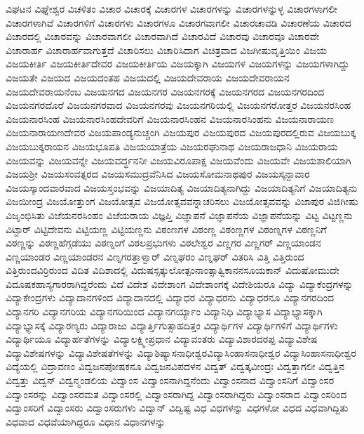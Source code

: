 {ವಿಘಟನ
ವಿಘ್ನೇಶ್ವರ
ವಿಚಳಿತಂ
ವಿಚಾರ
ವಿಚಾರಕ್ಕೆ
ವಿಚಾರಗಳ
ವಿಚಾರಗಳನ್ನು
ವಿಚಾರಗಳನ್ನುಳ್ಳ
ವಿಚಾರಗಳಾಗಲೀ
ವಿಚಾರಗಳಾಗಿವೆ
ವಿಚಾರಗಳಿಗೆ
ವಿಚಾರಗಳು
ವಿಚಾರಗಳೂ
ವಿಚಾರಗವಾಗಲೀ
ವಿಚಾರಚಾವಡಿ
ವಿಚಾರಣೆಯ
ವಿಚಾರದ
ವಿಚಾರದಲ್ಲಿ
ವಿಚಾರವನ್ನು
ವಿಚಾರವಾಗಲೀ
ವಿಚಾರವಾಗಿದೆ
ವಿಚಾರವಿದೆ
ವಿಚಾರವು
ವಿಚಾರವೂ
ವಿಚಾರವೇ
ವಿಚಾರಾರ್ಹ
ವಿಚಾರಾರ್ಹವಾಗುತ್ತದೆ
ವಿಚಾರಿಸಲು
ವಿಚಾರಿಸಿದಾಗ
ವಿಚಿತ್ರವಾದ
ವಿಜಗೀಷುವೃತ್ತಿಯಿಂ
ವಿಜಯ
ವಿಜಯಕೀರ್ತಿ
ವಿಜಯಕೀರ್ತಿದೇವರ
ವಿಜಯಕೀರ್ತಿಯ
ವಿಜಯಕ್ಕಾಗಿ
ವಿಜಯಗಳ
ವಿಜಯಗಳನ್ನು
ವಿಜಯಗಳಾಗಿದ್ದು
ವಿಜಯತೇ
ವಿಜಯದ
ವಿಜಯದಂತಹ
ವಿಜಯದಲ್ಲಿ
ವಿಜಯದೇವರಾಯ
ವಿಜಯದೇವರಾಯನ
ವಿಜಯದೇವರಾಯನೆಂಬ
ವಿಜಯನಗದ
ವಿಜಯನಗರ
ವಿಜಯನಗರಕ್ಕೆ
ವಿಜಯನಗರದ
ವಿಜಯನಗರದಿಂದ
ವಿಜಯನಗರದೊರೆ
ವಿಜಯನಗರವಾದ
ವಿಜಯನಗರವು
ವಿಜಯನಗರಿಯಲ್ಲಿ
ವಿಜಯನಗರೋತ್ತರ
ವಿಜಯನರಸಿಂಹ
ವಿಜಯನಾರಸಿಂಹ
ವಿಜಯನಾರಸಿಂಹದೇವರಿಗೆ
ವಿಜಯನಾರಸಿಂಹನ
ವಿಜಯನಾರಸಿಂಹನು
ವಿಜಯನಾರಾಯಣ
ವಿಜಯನಾರಾಯಣದೇವರ
ವಿಜಯಪಾಂಡ್ಯನುಚ್ಚಂಗಿ
ವಿಜಯಪುರ
ವಿಜಯಪುರದ
ವಿಜಯಪುರದಲ್ಲಿರುವ
ವಿಜಯಬುಕ್ಕ
ವಿಜಯಬುಕ್ಕರಾಯನ
ವಿಜಯಭೂಪತಿ
ವಿಜಯಯಾತ್ರೆಯ
ವಿಜಯರಘುನಾಥ
ವಿಜಯರಾಜಧಾನಿ
ವಿಜಯರಾಯ
ವಿಜಯವನ್ನು
ವಿಜಯವನ್ನೇ
ವಿಜಯವರ್ದ್ಧನನೀ
ವಿಜಯವಿರೂಪಾಕ್ಷ
ವಿಜಯವೆಂದು
ವಿಜಯವೇ
ವಿಜಯಶಾಲಿಯಾಗಿ
ವಿಜಯಶ್ರೀ
ವಿಜಯಸಂವತ್ಸರದ
ವಿಜಯಸಮುದ್ರವೆನಿಸಿದ
ವಿಜಯಸೋಮನಾಥಪುರ
ವಿಜಯಸ್ಕನ್ದಾವಾರ
ವಿಜಯಸ್ಕಾಂದವಾರವಾದ
ವಿಜಯಸ್ತಂಭವನ್ನು
ವಿಜಯಾದಿತ್ಯ
ವಿಜಯಾದಿತ್ಯನಾಗಿದ್ದು
ವಿಜಯಾದಿತ್ಯನಿಗೆ
ವಿಜಯಾದಿತ್ಯನು
ವಿಜಯೀಂದ್ರ
ವಿಜಯೋತ್ತುಂಗ
ವಿಜಯೋತ್ಸವ
ವಿಜಯೋತ್ಸವವನ್ನಾಚರಿಸಲು
ವಿಜಯೋತ್ಸವವನ್ನು
ವಿಜಾಪುರ
ವಿಜಿಗೀಷು
ವಿಜೃಂಭಿಸಿತು
ವಿಜೆಯನರಸಿಂಹಂ
ವಿಜೆಯರಾಯ
ವಿಜ್ಞಪ್ತಿ
ವಿಜ್ಞಾಪನೆ
ವಿಜ್ಞಾಪನೆಯ
ವಿಜ್ಞಾಪನೆಯನ್ನು
ವಿಟ್ಟ
ವಿಟ್ಟಣ್ಣನು
ವಿಟ್ಟಾರ್
ವಿಟ್ಟಿದೇವನು
ವಿಟ್ಟಿಯಣ್ಣ
ವಿಟ್ಟಿಯಣ್ಣನು
ವಿಠಂಣಗಳ
ವಿಠಂಣ್ಣ
ವಿಠಂಣ್ಣಗಳ
ವಿಠಂಣ್ನಗಳ
ವಿಠಣ್ಣನಿಗೆ
ವಿಠಣ್ಣನ್ನು
ವಿಠಣ್ಣಹೆಗ್ಗಡೆಯು
ವಿಠಣ್ನಂಗೆ
ವಿಠಲಪ್ರಭುಗಳು
ವಿಠಲೇಶ್ವರ
ವಿಣ್ಣಗರ
ವಿಣ್ಣಗರ್
ವಿಣ್ಣಯಾಂಡನ
ವಿಣ್ಣಯಾಂಡರ
ವಿಣ್ಣಯಾಂಡರನ
ವಿಣ್ನಗರತ್ತಾಳ್ವಾರ್
ವಿಣ್ನಘರಂ
ವಿಣ್ನಘರ್
ವಿತರಿಸಿ
ವಿತ್ತಿ
ವಿತ್ತಿರುಂದ
ವಿತ್ತಿರುಂದವಿರ್ರಿರುಂದ
ವಿದಿತ
ವಿದಿಶಾದಲ್ಲಿ
ವಿದುಷಸ್ಸತ್ಕುಲೋತ್ಪಂನಾಂತ್ಸಾತ್ವಿಕಾನನಸೂಯಕಾನ್
ವಿದುಷೋಮುದೇ
ವಿದೂಷಕಹಾಸ್ಯಗಾರರಾಗಿದ್ದರೆಂದು
ವಿದೆ
ವಿದೇಶ
ವಿದೇಶಾಂಗ
ವಿದೇಶಾಂಗಕ್ಕೆ
ವಿದೇಶಿಯರೂ
ವಿದ್ಯಾ
ವಿದ್ಯಾಕೆಂದ್ರಗಳನ್ನು
ವಿದ್ಯಾಕೇಂದ್ರಗಳು
ವಿದ್ಯಾದಾನಗಳಿಂದ
ವಿದ್ಯಾದಾನದಲ್ಲಿ
ವಿದ್ಯಾಧರ
ವಿದ್ಯಾಧರನು
ವಿದ್ಯಾಧರನೂ
ವಿದ್ಯಾನಗರದಿಂದ
ವಿದ್ಯಾನಗರಿ
ವಿದ್ಯಾನಗರಿಯ
ವಿದ್ಯಾನಗರಿಯಿಂದ
ವಿದ್ಯಾನಗರ್ಯ್ಯಾಂ
ವಿದ್ಯಾನಿಧಿ
ವಿದ್ಯಾಭ್ಯಾಸ
ವಿದ್ಯಾಭ್ಯಾಸಕ್ಕಾಗಿ
ವಿದ್ಯಾಭ್ಯಾಸಕ್ಕೆ
ವಿದ್ಯಾರಣ್ಯರು
ವಿದ್ಯಾರಾಜು
ವಿದ್ಯಾರ್ತ್ತಿಗುತ್ಸಾಹದಿತ್ತಂ
ವಿದ್ಯಾರ್ಥಿಗಳ
ವಿದ್ಯಾರ್ಥಿಗಳಿಗೆ
ವಿದ್ಯಾರ್ಥಿಗಳು
ವಿದ್ಯಾರ್ಥಿಯೂ
ವಿದ್ಯಾರ್ಹತೆಗಳನ್ನು
ವಿದ್ಯಾಲಕ್ಷ್ಮೀಪ್ರಧಾನ
ವಿದ್ಯಾವಂತರು
ವಿದ್ಯಾವಿಶಾರದರಪ್ಪ
ವಿದ್ಯಾವಿಶೇಷ
ವಿದ್ಯಾವಿಶೇಷಗಳನ್ನು
ವಿದ್ಯಾವಿಶೇಷತೆಗಳನ್ನು
ವಿದ್ಯಾಶಿಷ್ಯಾಸನಾಧೀಶ್ವರವಿದ್ಯಾಸಿಂಹಾಸನಾಧೀಶ್ವರ
ವಿದ್ಯಾಸಿಂಹಾಸನಾಧೀಶ್ವರ
ವಿದ್ಯೆಯಲ್ಲಿ
ವಿದ್ರಾವಣಂ
ವಿದ್ವಜನಪೋಷಕನೂ
ವಿದ್ವಜನವಿಪದಳನ
ವಿದ್ವತ್
ವಿದ್ವತ್ಕವೀಂದ್ರಃ
ವಿದ್ವತ್ತಾಗಲೀ
ವಿದ್ವತ್ತಿನ
ವಿದ್ವತ್ತು
ವಿದ್ವನ್
ವಿದ್ವನ್ಮಂಡಲಿಯ
ವಿದ್ವಾಂಸ
ವಿದ್ವಾಂಸನಾಗಿದ್ದನೆಂದು
ವಿದ್ವಾಂಸನಾದ
ವಿದ್ವಾಂಸನಿಗೆ
ವಿದ್ವಾಂಸರ
ವಿದ್ವಾಂಸರನ್ನು
ವಿದ್ವಾಂಸರಮತ
ವಿದ್ವಾಂಸರಲ್ಲಿ
ವಿದ್ವಾಂಸರಾಗಿದ್ದ
ವಿದ್ವಾಂಸರಾಗಿದ್ದರು
ವಿದ್ವಾಂಸರಾದ
ವಿದ್ವಾಂಸರಿಂದ
ವಿದ್ವಾಂಸರಿಗೆ
ವಿದ್ವಾಂಸರು
ವಿದ್ವಾಂಸರುಗಳು
ವಿದ್ವಾನ್
ವಿದ್ವಿಷ್ಟ
ವಿಧ
ವಿಧಗಳನ್ನು
ವಿಧಗಳೋ
ವಿಧದ
ವಿಧವಾಗಿದ್ದಿತು
ವಿಧವಾದ
ವಿಧವೆಯಾಗಿದ್ದರೂ
ವಿಧಾನ
ವಿಧಾನಗಳನ್ನು
}

